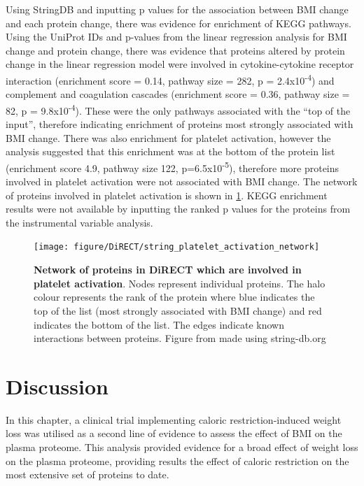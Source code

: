 \documentclass[11pt,twoside]{bristolthesis}
\newcommand{\blandscape}{\begin{landscape}}
\newcommand{\elandscape}{\end{landscape}}
\begin{document}
Using StringDB and inputting p values for the association between BMI change and each protein change, there was evidence for enrichment of KEGG pathways. Using the UniProt IDs and p-values from the linear regression analysis for BMI change and protein change, there was evidence that proteins altered by protein change in the linear regression model were involved in cytokine-cytokine receptor interaction (enrichment score = 0.14, pathway size = 282, p = 2.4x10\textsuperscript{-4}) and complement and coagulation cascades (enrichment score = 0.36, pathway size = 82, p = 9.8x10\textsuperscript{-4}). These were the only pathways associated with the ``top of the input'', therefore indicating enrichment of proteins most strongly associated with BMI change. There was also enrichment for platelet activation, however the analysis suggested that this enrichment was at the bottom of the protein list (enrichment score 4.9, pathway size 122, p=6.5x10\textsuperscript{-5}), therefore more proteins involved in platelet activation were not associated with BMI change. The network of proteins involved in platelet activation is shown in \ref{fig:platelet-enrichment}. KEGG enrichment results were not available by inputting the ranked p values for the proteins from the instrumental variable analysis.

\blandscape



\begin{figure}
\texttt{[image: figure/DiRECT/string\_platelet\_activation\_network]} \caption[Network of proteins in DiRECT which are involved in platelet activation.]{\textbf{Network of proteins in DiRECT which are involved in platelet activation}. Nodes represent individual proteins. The halo colour represents the rank of the protein where blue indicates the top of the list (most strongly associated with BMI change) and red indicates the bottom of the list. The edges indicate known interactions between proteins. Figure from made using string-db.org}\label{fig:platelet-enrichment}
\end{figure}
\elandscape

\hypertarget{discussion-4}{%
\section{Discussion}\label{discussion-4}}

In this chapter, a clinical trial implementing caloric restriction-induced weight loss was utilised as a second line of evidence to assess the effect of BMI on the plasma proteome. This analysis provided evidence for a broad effect of weight loss on the plasma proteome, providing results the effect of caloric restriction on the most extensive set of proteins to date.
\end{document}
